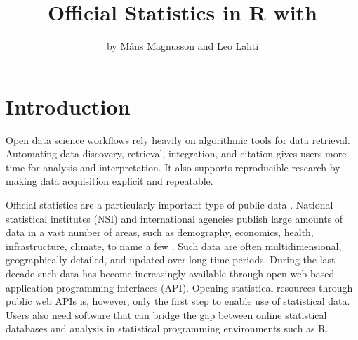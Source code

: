 \title{Official Statistics in R with }
\author{by M\r{a}ns Magnusson and Leo Lahti}

\maketitle



\section{Introduction}

Open data science workflows rely heavily on algorithmic tools for data retrieval.
Automating data discovery, retrieval, integration, and citation gives users more time for analysis and interpretation.
It also supports reproducible research \citep{Gandrud13, Boettiger2015} by making data acquisition explicit and repeatable.

Official statistics are a particularly important type of public data \citep{UNGA_2014_FPOS}.
National statistical institutes (NSI) and international agencies publish large amounts of data in a vast number of areas, such as demography, economics, health, infrastructure, climate, to name a few \citep{UNGA_2014_FPOS,WorldBank_WDI}.
Such data are often multidimensional, geographically detailed, and updated over long time periods.
During the last decade such data has become increasingly available through open web-based application programming interfaces (API).
Opening statistical resources through public web APIs is, however, only the first step to enable use of statistical data.
Users also need software that can bridge the gap between online statistical databases and analysis in statistical programming environments such as R.

